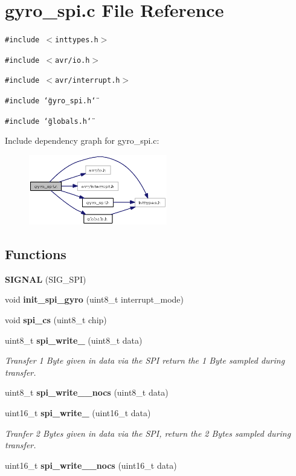 \section{gyro\_\-spi.c File Reference}
\label{gyro__spi_8c}
{\tt \#include $<$inttypes.h$>$}\par
{\tt \#include $<$avr/io.h$>$}\par
{\tt \#include $<$avr/interrupt.h$>$}\par
{\tt \#include \char`\"{}gyro\_\-spi.h\char`\"{}}\par
{\tt \#include \char`\"{}globals.h\char`\"{}}\par


Include dependency graph for gyro\_\-spi.c:\begin{figure}[H]
\begin{center}
\leavevmode
\includegraphics[width=171pt]{gyro__spi_8c__incl}
\end{center}
\end{figure}
\subsection*{Functions}
\begin{CompactItemize}
\item 
{\bf SIGNAL} (SIG\_\-SPI)
\item 
void {\bf init\_\-spi\_\-gyro} (uint8\_\-t interrupt\_\-mode)
\item 
void {\bf spi\_\-cs} (uint8\_\-t chip)
\item 
uint8\_\-t {\bf spi\_\-write\_} (uint8\_\-t data)
\begin{CompactList}\small\item\em Transfer 1 Byte given in data via the SPI return the 1 Byte sampled during transfer. \item\end{CompactList}\item 
uint8\_\-t {\bf spi\_\-write\_\_\-nocs} (uint8\_\-t data)
\item 
uint16\_\-t {\bf spi\_\-write\_} (uint16\_\-t data)
\begin{CompactList}\small\item\em Tranfer 2 Bytes given in data via the SPI, return the 2 Bytes sampled during transfer. \item\end{CompactList}\item 
uint16\_\-t {\bf spi\_\-write\_\_\-nocs} (uint16\_\-t data)
\end{CompactItemize}
